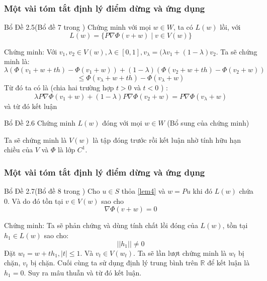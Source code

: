\documentclass{beamer}
\begin{document}


\begin{frame}
\frametitle{Một vài tóm tắt định lý điểm dừng và ứng dụng }
\begin{block}{Bổ Đề 2.5(Bổ đề 7 trong \cite{YJMM})}
Chứng minh với mọi $w \in W$, ta có $L(w)$ lồi, với
  \[ L(w)= \{ P \nabla \Phi(v+w) \mid v \in V(w)\}\]
\end{block}
Chứng minh: Với $v_1,v_2\in V(w),\lambda \in [0,1],v_{\lambda}=(\lambda v_1 +(1-\lambda)v_2$.
Ta sẽ chứng minh là: $$\lambda ( \Phi (v_1+w+th)-\Phi(v_1+w )) + (1-\lambda ) (\Phi(v_2+w+th)-\Phi(v_2+w))$$$$\leq \Phi(v_\lambda +w+th)-\Phi(v_\lambda +w)$$
Từ đó ta có là (chia hai trường hợp $t>0$ và $t<0$ ) :
$$\lambda P \nabla \Phi(v_1+w) + (1-\lambda )P \nabla \Phi (v_2 +w) = P \nabla \Phi(v_\lambda +w)$$
và từ đó kết luận
\end{frame}



\begin{frame}
\begin{block}{Bổ Đề 2.6}
Chứng minh $L(w)$ đóng với mọi $w \in W$
(Bổ sung của chứng minh)
\end{block}
Ta sẽ chứng minh là $V(w)$ là tập đóng trước rồi kết luận nhờ tính hữu hạn chiều của $V$ và $\Phi$ là lớp $C^1$.
\end{frame}



\begin{frame}
\frametitle{Một vài tóm tắt định lý điểm dừng và ứng dụng }
\begin{block}{Bổ Đề 2.7(Bổ đề 8 trong \cite{YJMM})}
 Cho $u \in S$ thỏa \eqref{lem4} và $w=Pu$ khi đó $L(w)$ chứa 0. Và do đó tồn tại $v \in V(w)$ sao cho 
\[ \nabla \Phi(v +w)=0\]
\end{block}
Chứng minh: Ta sẽ phản chứng và dùng tính chất lồi đóng của $L(w)$, tồn tại $h_1\in L(w)$ sao cho: $$||h_1||\neq 0$$
Đặt $w_{t}=w+th_1,|t|\leq 1$. Và $v_t\in V(w_t)$. Ta sẽ lần lượt chứng minh là $w_t$ bị chặn, $v_t$ bị chặn. Cuối cùng ta sử dụng định lý trung bình trên $\mathbb{R}$ để kết luận là $h_1=0$. Suy ra mâu thuẫn và từ đó kết luận.
\end{frame}
\end{document}
